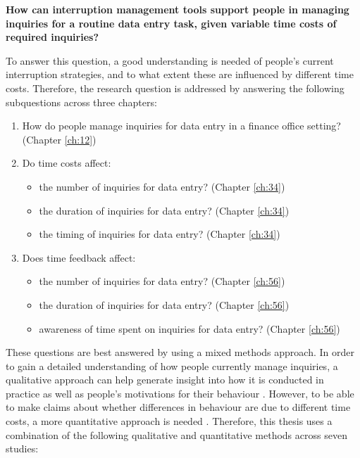\textbf{How can interruption management tools support people in managing inquiries for a routine data entry task, given variable time costs of required inquiries?}

To answer this question, a good understanding is needed of people's current interruption strategies, and to what extent these are influenced by different time costs. Therefore, the research question is addressed by answering the following subquestions across three chapters:

\begin{enumerate}
\item How do people manage inquiries for data entry in a finance office setting? (Chapter \ref{ch:12})
\item Do time costs affect:
\begin{itemize}
\item the number of inquiries for data entry? (Chapter \ref{ch:34})
\item the duration of inquiries for data entry? (Chapter \ref{ch:34})
\item the timing of inquiries for data entry?  (Chapter \ref{ch:34})
\end{itemize}
\item Does time feedback affect:
\begin{itemize}
\item the number of inquiries for data entry? (Chapter \ref{ch:56})
\item the duration of inquiries for data entry? (Chapter \ref{ch:56})
\item awareness of time spent on inquiries for data entry? (Chapter \ref{ch:56})
\end{itemize}
\end{enumerate}

These questions are best answered by using a mixed methods approach. In order to gain a detailed understanding of how people currently manage inquiries, a qualitative approach can help generate insight into how it is conducted in practice as well as people's motivations for their behaviour \citep{Blandford2016}. However, to be able to make claims about whether differences in behaviour are due to different time costs, a more quantitative approach is needed \citep{Cairns2008}.  
Therefore, this thesis uses a combination of the following qualitative and quantitative methods across seven studies:

